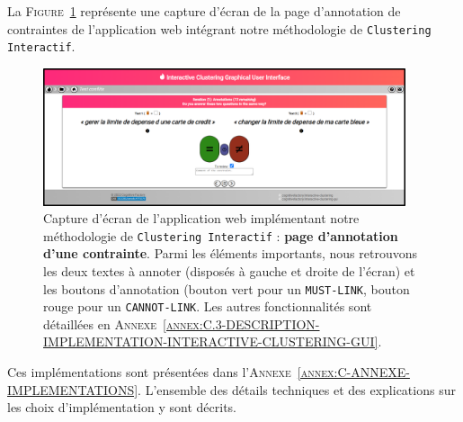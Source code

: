 		
		\begin{leftBarExamples}
			La \textsc{Figure~\ref{figure:3.2.3-DESCRIPTION-TECHNIQUE-IMPLEMENTATION-EXEMPLE}} représente une capture d'écran de la page d'annotation de contraintes de l'application web intégrant notre méthodologie de \texttt{Clustering Interactif}.
			
			\begin{figure}[H]
				\centering
				\includegraphics[width=0.95\textwidth]{figures/interactive-clustering-application-annotation-0small}
				\caption{
					Capture d'écran de l'application web implémentant notre méthodologie de \texttt{Clustering Interactif} : \textbf{page d'annotation d'une contrainte}.
					Parmi les éléments importants, nous retrouvons les deux textes à annoter (disposés à gauche et droite de l'écran) et les boutons d'annotation (bouton vert pour un \texttt{MUST-LINK}, bouton rouge pour un \texttt{CANNOT-LINK}.
					Les autres fonctionnalités sont détaillées en \textsc{Annexe~\ref{annex:C.3-DESCRIPTION-IMPLEMENTATION-INTERACTIVE-CLUSTERING-GUI}}.
				}
				\label{figure:3.2.3-DESCRIPTION-TECHNIQUE-IMPLEMENTATION-EXEMPLE}
			\end{figure}
		\end{leftBarExamples}
		
		\begin{leftBarInformation}
			Ces implémentations sont présentées dans l'\textsc{Annexe~\ref{annex:C-ANNEXE-IMPLEMENTATIONS}}.
			L'ensemble des détails techniques et des explications sur les choix d'implémentation y sont décrits.
		\end{leftBarInformation}